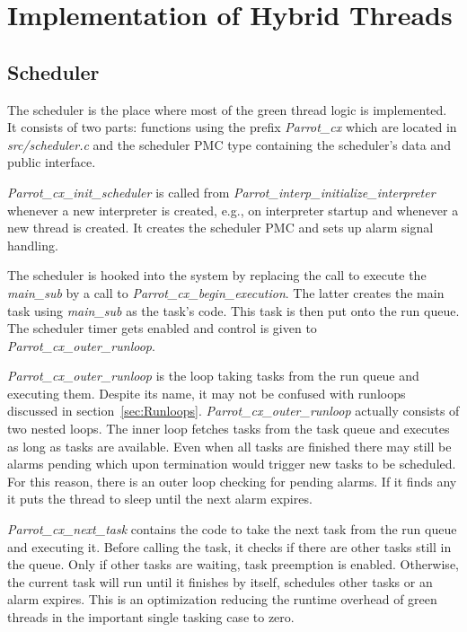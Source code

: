 \documentclass[bachelor,english]{hgbthesis}
\begin{document}
\chapter{Implementation of Hybrid Threads}

\section{Scheduler}

The scheduler is the place where most of the green thread logic is implemented. It consists of two parts: functions using the prefix \textit{Parrot\_cx} which are located in \textit{src/scheduler.c} and the scheduler PMC type containing the scheduler's data and public interface.

\textit{Parrot\_cx\_init\_scheduler} is called from \textit{Parrot\_interp\_initialize\_interpreter} whenever a new interpreter is created, e.g., on interpreter startup and whenever a new thread is created. It creates the scheduler PMC and sets up alarm signal handling.

The scheduler is hooked into the system by replacing the call to execute the \textit{main\_sub} by a call to \textit{Parrot\_cx\_begin\_execution}. The latter creates the main task using \textit{main\_sub} as the task's code. This task is then put onto the run queue. The scheduler timer gets enabled and control is given to \textit{Parrot\_cx\_outer\_runloop}.

\textit{Parrot\_cx\_outer\_runloop} is the loop taking tasks from the run queue and executing them. Despite its name, it may not be confused with runloops discussed in section~\ref{sec:Runloops}. \textit{Parrot\_cx\_outer\_runloop} actually consists of two nested loops. The inner loop fetches tasks from the task queue and executes as long as tasks are available. Even when all tasks are finished there may still be alarms pending which upon termination would trigger new tasks to be scheduled. For this reason, there is an outer loop checking for pending alarms. If it finds any it puts the thread to sleep until the next alarm expires.

\textit{Parrot\_cx\_next\_task} contains the code to take the next task from the run queue and executing it. Before calling the task, it checks if there are other tasks still in the queue. Only if other tasks are waiting, task preemption is enabled. Otherwise, the current task will run until it finishes by itself, schedules other tasks or an alarm expires. This is an optimization reducing the runtime overhead of green threads in the important single tasking case to zero.
\end{document}

